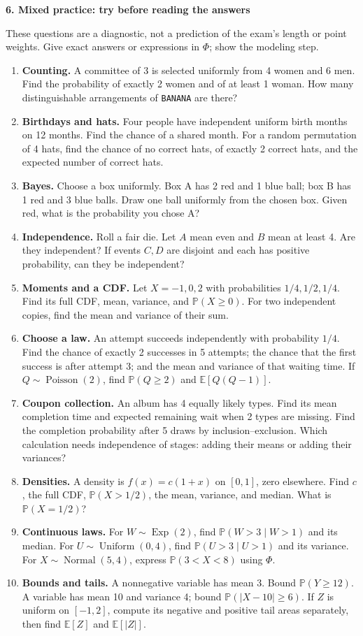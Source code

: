 \documentclass[11pt,letterpaper]{article}
\renewcommand{\P}{\mathbb P}
\newcommand{\E}{\mathbb E}
\newcommand{\topic}[1]{{\Large\bfseries\color{indigo}#1}\par\medskip}
\begin{document}
\newpage
\topic{6. Mixed practice: try before reading the answers}
These questions are a diagnostic, not a prediction of the exam's length or
point weights. Give exact answers or expressions in $\Phi$; show the modeling step.
\begin{enumerate}
\item \textbf{Counting.} A committee of 3 is selected uniformly from 4 women
and 6 men. Find the probability of exactly 2 women and of at least 1 woman.
How many distinguishable arrangements of \texttt{BANANA} are there?
\item \textbf{Birthdays and hats.} Four people have independent uniform
birth months on 12 months. Find the chance of a shared month.
For a random permutation of 4 hats, find the chance of no correct hats,
of exactly 2 correct hats, and the expected number of correct hats.
\item \textbf{Bayes.} Choose a box uniformly. Box A has 2 red and 1 blue
ball; box B has 1 red and 3 blue balls. Draw one ball uniformly from the
chosen box. Given red, what is the probability you chose A?
\item \textbf{Independence.} Roll a fair die. Let $A$ mean even and $B$
mean at least 4. Are they independent? If events $C,D$ are disjoint and
each has positive probability, can they be independent?
\item \textbf{Moments and a CDF.} Let $X=-1,0,2$ with probabilities
$1/4,1/2,1/4$. Find its full CDF, mean, variance, and $\P(X\ge0)$.
For two independent copies, find the mean and variance of their sum.
\item \textbf{Choose a law.} An attempt succeeds independently with
probability $1/4$. Find the chance of exactly 2 successes in 5 attempts;
the chance that the first success is after attempt 3; and the mean and
variance of that waiting time. If $Q\sim\operatorname{Poisson}(2)$, find
$\P(Q\ge2)$ and $\E[Q(Q-1)]$.
\item \textbf{Coupon collection.} An album has 4 equally likely types.
Find its mean completion time and expected remaining wait when 2 types
are missing. Find the completion probability after 5 draws by
inclusion--exclusion. Which calculation needs independence of stages:
adding their means or adding their variances?
\item \textbf{Densities.} A density is $f(x)=c(1+x)$ on $[0,1]$, zero
elsewhere. Find $c$, the full CDF, $\P(X>1/2)$, the mean, variance,
and median. What is $\P(X=1/2)$?
\item \textbf{Continuous laws.} For $W\sim\operatorname{Exp}(2)$, find
$\P(W>3\mid W>1)$ and its median. For $U\sim\operatorname{Uniform}(0,4)$,
find $\P(U>3\mid U>1)$ and its variance.
For $X\sim\operatorname{Normal}(5,4)$, express $\P(3<X<8)$ using $\Phi$.
\item \textbf{Bounds and tails.} A nonnegative variable has mean 3.
Bound $\P(Y\ge12)$. A variable has mean 10 and variance 4;
bound $\P(|X-10|\ge6)$. If $Z$ is uniform on $[-1,2]$, compute
its negative and positive tail areas separately, then find $\E[Z]$
and $\E[|Z|]$.
\end{enumerate}
\end{document}
